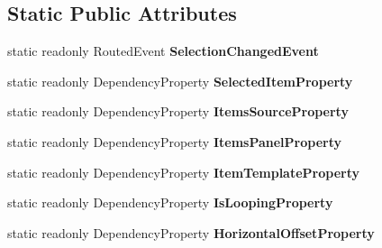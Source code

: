 \subsection*{Static Public Attributes}
\begin{DoxyCompactItemize}
\item 
static readonly Routed\-Event {\bfseries Selection\-Changed\-Event}
\item 
static readonly Dependency\-Property {\bfseries Selected\-Item\-Property}
\item 
static readonly Dependency\-Property {\bfseries Items\-Source\-Property}
\item 
static readonly Dependency\-Property {\bfseries Items\-Panel\-Property}
\item 
static readonly Dependency\-Property {\bfseries Item\-Template\-Property}
\item 
static readonly Dependency\-Property {\bfseries Is\-Looping\-Property}
\item 
static readonly Dependency\-Property {\bfseries Horizontal\-Offset\-Property}
\end{DoxyCompactItemize}
